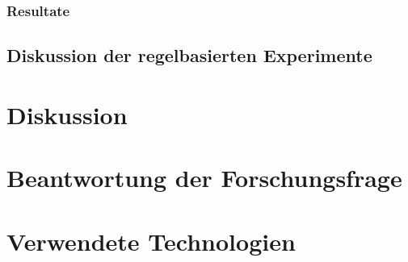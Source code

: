 \subsubsection{Resultate}
\subsection{Diskussion der regelbasierten Experimente}
\section{Diskussion}
\section{Beantwortung der Forschungsfrage}
\section{Verwendete Technologien}
